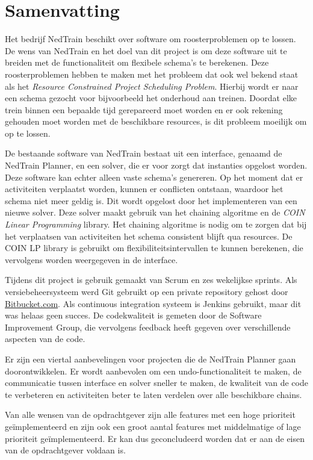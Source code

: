 \section*{Samenvatting}
Het bedrijf NedTrain beschikt over software om roosterproblemen op te lossen. De wens van NedTrain en het doel van dit project is om deze software uit te breiden met de functionaliteit om flexibele schema's te berekenen. Deze roosterproblemen hebben te maken met het probleem dat ook wel bekend staat als het \emph{Resource Constrained Project Scheduling Problem}. Hierbij wordt er naar een schema gezocht voor bijvoorbeeld het onderhoud aan treinen. Doordat elke trein binnen een bepaalde tijd gerepareerd moet worden en er ook rekening gehouden moet worden met de beschikbare resources, is dit probleem moeilijk om op te lossen.

De bestaande software van NedTrain bestaat uit een interface, genaamd de NedTrain Planner, en een solver, die er voor zorgt dat instanties opgelost worden. Deze software kan echter alleen vaste schema's genereren. Op het moment dat er activiteiten verplaatst worden, kunnen er conflicten ontstaan, waardoor het schema niet meer geldig is. Dit wordt opgelost door het implementeren van een nieuwe solver. Deze solver maakt gebruik van het chaining algoritme en de \emph{COIN Linear Programming} library. Het chaining algoritme is nodig om te zorgen dat bij het verplaatsen van activiteiten het schema consistent blijft qua resources. De COIN LP library is gebruikt om flexibiliteitsintervallen te kunnen berekenen, die vervolgens worden weergegeven in de interface. 

Tijdens dit project is gebruik gemaakt van Scrum en zes wekelijkse sprints. Als versiebeheersysteem werd Git gebruikt op een private repository gehost door \href{http://bitbucket.com}{Bitbucket.com}. Als continuous integration systeem is Jenkins gebruikt, maar dit was helaas geen succes. De codekwaliteit is gemeten door de Software Improvement Group, die vervolgens feedback heeft gegeven over verschillende aspecten van de code. 

Er zijn een viertal aanbevelingen voor projecten die de NedTrain Planner gaan doorontwikkelen. Er wordt aanbevolen om een undo-functionaliteit te maken, de communicatie tussen interface en solver sneller te maken, de kwaliteit van de code te verbeteren en activiteiten beter te laten verdelen over alle beschikbare chains.

Van alle wensen van de opdrachtgever zijn alle features met een hoge prioriteit ge\"implementeerd en zijn ook een groot aantal features met middelmatige of lage prioriteit ge\"implementeerd. Er kan dus geconcludeerd worden dat er aan de eisen van de opdrachtgever voldaan is.
